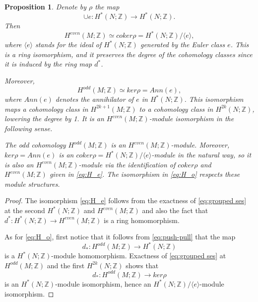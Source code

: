 \documentclass[12pt]{amsart}
\newtheorem{proposition}[theorem]{Proposition}
\theoremstyle{definition}
\numberwithin{equation}{section}
\begin{document}
\begin{proposition}\label{prop:(co)ker rho}
Denote by $\rho$ the map
\[\cup e: H^{*}(N;{{\mathbb{Z}}})\rightarrow H^{*}(N;{{\mathbb{Z}}}).\]
Then
\begin{equation}\label{eq:H_e}
H^{even}(M;{{\mathbb{Z}}})\simeq coker\rho = H^{*}(N;{{\mathbb{Z}}})/\langle e\rangle,
\end{equation}
where $\langle e\rangle$ stands for the ideal of $H^{*}(N;{{\mathbb{Z}}})$
generated by the Euler class $e$. This is a ring isomorphism, and it
preserves the degree of the cohomology classes since it is induced
by the ring map $d^{*}$.

 Moreover,
\begin{equation}\label{eq:H_o}
H^{odd}(M;{{\mathbb{Z}}})\simeq  ker\rho = Ann(e),
\end{equation}
where $Ann(e)$ denotes the annihilator of $e$ in $H^{*}(N;{{\mathbb{Z}}})$. This
isomorphism maps a cohomology class in $H^{2k+1}(M;{{\mathbb{Z}}})$ to a
cohomology class in $H^{2k}(N;{{\mathbb{Z}}})$, lowering the degree by 1. It is
an $H^{even}(M;{{\mathbb{Z}}})$-module isomorphism in the following sense.

The odd cohomology $H^{odd}(M;{{\mathbb{Z}}})$ is an $H^{even}(M;{{\mathbb{Z}}})$-module.
Moreover, $ker\rho = Ann(e)$ is an $coker\rho = H^{*}(N;{{\mathbb{Z}}})/\langle
e\rangle$-module in the natural way, so it is also an
$H^{even}(M;{{\mathbb{Z}}})$-module via the identification of $coker\rho$ and
$H^{even}(M;{{\mathbb{Z}}})$ given in \eqref{eq:H_e}. The isomorphism in
\eqref{eq:H_o} respects these module structures.
\end{proposition}
\begin{proof}
The isomorphism \eqref{eq:H_e} follows from the exactness of
\eqref{eq:grouped ses} at the second $H^{*}(N;{{\mathbb{Z}}})$ and
$H^{even}(M;{{\mathbb{Z}}})$ and also the fact that $d^{*}:
H^{*}(N;{{\mathbb{Z}}})\rightarrow H^{even}(M;{{\mathbb{Z}}})$ is a ring homomorphism.

As for \eqref{eq:H_o}, first notice that it follows from
\eqref{eq:push-pull} that the map
\begin{equation}
d_{*}: H^{odd}(M;{{\mathbb{Z}}})\rightarrow H^{*}(N;{{\mathbb{Z}}})
\end{equation}
is a $H^{*}(N;{{\mathbb{Z}}})$-module homomorphism. Exactness of
\eqref{eq:grouped ses} at $H^{odd}(M;{{\mathbb{Z}}})$ and the first
$H^{2k}(N;{{\mathbb{Z}}})$ shows that
\begin{equation}
d_{*}: H^{odd}(M;{{\mathbb{Z}}})\rightarrow ker\rho
\end{equation}
is an $H^{*}(N;{{\mathbb{Z}}})$-module isomorphism, hence an
$H^{*}(N;{{\mathbb{Z}}})/\langle e\rangle$-module isomorphism.
\end{proof}
\end{document}

